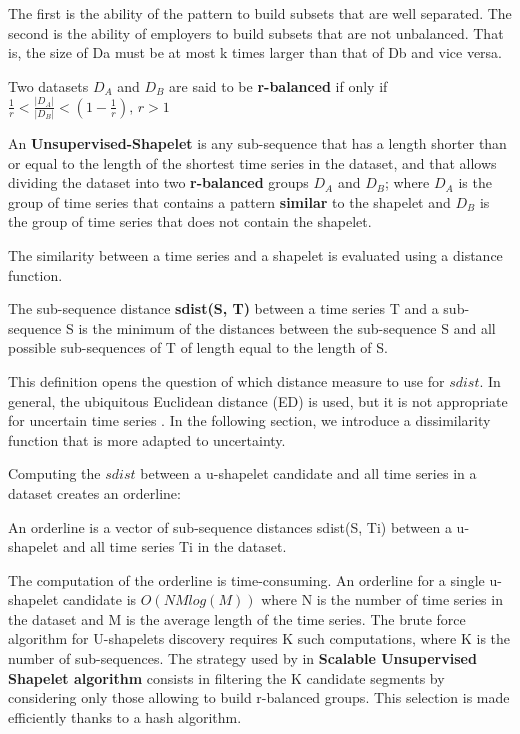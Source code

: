 The first is the ability of the pattern to build subsets that are well separated.
The second is the ability of employers to build subsets that are not unbalanced. That is, the size of Da must be at most k times larger than that of Db and vice versa.

\begin{definition}
Two datasets  $D_A$ and $D_B$ are said to be \textbf{r-balanced} if only if
$\frac{1}{r}<\frac{|D_{A}|}{|D_{B}|}<(1-\frac{1}{r}),\,r>1$
\end{definition}


\begin{definition}
An \textbf{Unsupervised-Shapelet} is any sub-sequence that has a length shorter than or equal to the length of the shortest time series in the dataset, and that allows dividing the dataset into two
\textbf{r-balanced} groups $D_A$ and $D_B$; where $D_A$ is the group of time series that contains a pattern \textbf{similar} to the shapelet and $D_B$ is the group of
time series that does not contain the shapelet.
\end{definition}

The similarity between a time series and a shapelet is evaluated using a distance function.


\begin{definition}
The sub-sequence distance \textbf{sdist(S, T)} between
a time series T and a sub-sequence S is the minimum of the
distances between the sub-sequence S and all possible
sub-sequences of T of length equal to the length of S.
\end{definition}
This definition opens the question of which distance measure to use for $sdist$.
In general, the ubiquitous Euclidean distance (ED) is used, but it is not
appropriate for uncertain time series \cite{Orang2014}. In the following section, we introduce a
dissimilarity function that is more adapted to  uncertainty.   


Computing the $sdist$ between a u-shapelet candidate
and all time series in a dataset creates an orderline:


\begin{definition}
An orderline is a vector of sub-sequence
distances sdist(S, Ti) between a u-shapelet and all time series Ti in the dataset.
\end{definition}

The computation of the orderline is time-consuming. An orderline for a single u-shapelet candidate is $O(NMlog(M))$ where N is the number of time series in the dataset and M is the average length of the time series. The brute force algorithm for U-shapelets discovery requires K such computations, where K is the number of sub-sequences. The strategy used by \cite{ulanova2015scalable} in \textbf{Scalable Unsupervised Shapelet algorithm} consists in filtering the K candidate segments  by considering only those allowing to build r-balanced groups.  This selection is made efficiently thanks to a hash algorithm.       


